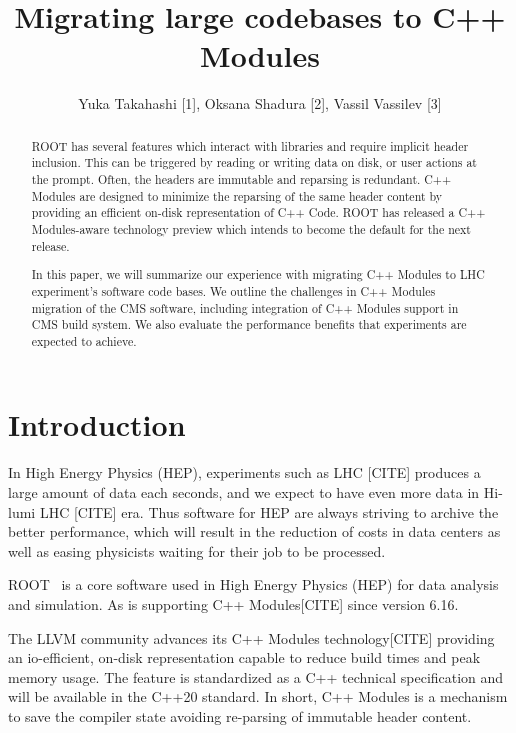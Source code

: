 \documentclass[12pt]{iopart}
\begin{document}
\title{Migrating large codebases to C++ Modules}

\author{Yuka Takahashi [1], Oksana Shadura [2], Vassil Vassilev [3]}
\address{[1] University of Tokyo, [2] University of Nebraska-Lincoln, [3] Princeton University}

\begin{abstract}
ROOT has several features which interact with libraries and require implicit header inclusion. This can be triggered by reading or writing data on disk, or user actions at the prompt. Often, the headers are immutable and reparsing is redundant. C++ Modules are designed to minimize the reparsing of the same header content by providing an efficient on-disk representation of C++ Code. ROOT has released a C++ Modules-aware technology preview which intends to become the default for the next release.

In this paper, we will summarize our experience with migrating C++ Modules to LHC experiment's software code bases. We outline the challenges in C++ Modules migration of the CMS software, including integration of C++ Modules support in CMS build system. We also evaluate the performance benefits that experiments are expected to achieve.
\end{abstract}

\section{Introduction}
\label{intro}

In High Energy Physics (HEP), experiments such as LHC [CITE] produces a large amount of data each seconds, and we expect to have even more data in Hi-lumi LHC [CITE] era. Thus software for HEP are always striving to archive the better performance, which will result in the reduction of costs in data centers as well as easing physicists waiting for their job to be processed.

ROOT~\cite{root} is a core software used in High Energy Physics (HEP) for data analysis and simulation. As
is supporting C++ Modules[CITE] since version 6.16. 

The LLVM community advances its C++ Modules technology[CITE] providing an io-efficient, on-disk representation capable to reduce build times and peak memory usage.  The feature is standardized as a C++ technical specification and will be available in the C++20 standard. In short, C++ Modules is a mechanism to save the compiler state avoiding re-parsing of immutable header content.
\end{document}
